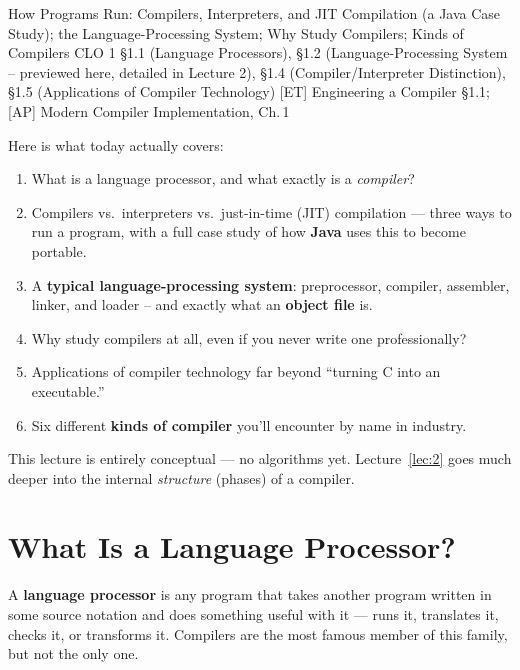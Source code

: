 \documentclass[full-course-notes.tex]{subfiles}
\begin{document}
  {How Programs Run: Compilers, Interpreters, and JIT Compilation (a Java Case Study); the
   Language-Processing System; Why Study Compilers; Kinds of Compilers}
  {CLO 1}
  {\S1.1 (Language Processors), \S1.2 (Language-Processing System -- previewed here, detailed in Lecture 2), \S1.4 (Compiler/Interpreter Distinction), \S1.5 (Applications of Compiler Technology)}
  {[ET] Engineering a Compiler \S1.1; [AP] Modern Compiler Implementation, Ch.\,1}
\setcounter{section}{0}
\makelecturetitle

Here is what today actually covers:

\begin{coreidea}
\begin{enumerate}
  \item What is a language processor, and what exactly is a \emph{compiler}?
  \item Compilers vs.\ interpreters vs.\ just-in-time (JIT) compilation --- three ways to run a
  program, with a full case study of how \textbf{Java} uses this to become portable.
  \item A \textbf{typical language-processing system}: preprocessor, compiler, assembler,
  linker, and loader -- and exactly what an \textbf{object file} is.
  \item Why study compilers at all, even if you never write one professionally?
  \item Applications of compiler technology far beyond ``turning C into an executable.''
  \item Six different \textbf{kinds of compiler} you'll encounter by name in industry.
\end{enumerate}
This lecture is entirely conceptual --- no algorithms yet. Lecture~\ref{lec:2} goes much deeper
into the internal \emph{structure} (phases) of a compiler.
\end{coreidea}

\section{What Is a Language Processor?}
\label{sec:l1-language-processor}

\dbtag A \textbf{language processor} is any program that takes another program written in
some source notation and does something useful with it --- runs it, translates it, checks it,
or transforms it. Compilers are the most famous member of this family, but not the only one.
\end{document}
